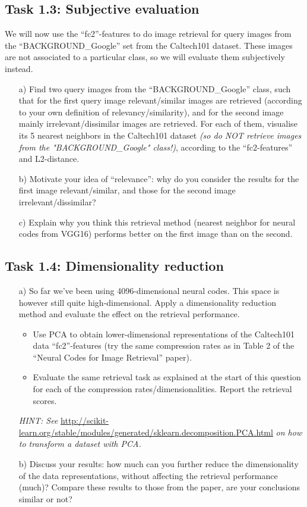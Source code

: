 \documentclass[a4paper,twoside,10pt]{article}
\begin{document}
\subsection*{Task 1.3: Subjective evaluation}
We will now use the ``fc2''-features to do image retrieval for query images from the ``BACKGROUND\_Google'' set from the Caltech101 dataset. These images are not associated to a particular class, so we will evaluate them subjectively instead.
\begin{itemize}
  \item[a)] Find two query images from the ``BACKGROUND\_Google'' class, such that for the first query image relevant/similar images are retrieved (according to your own definition of relevancy/similarity), and for the second image mainly irrelevant/dissimilar images are retrieved. For each of them, visualise its 5 nearest neighbors in the Caltech101 dataset \emph{(so do NOT retrieve images from the "BACKGROUND\_Google" class!)}, according to the ``fc2-features'' and L2-distance.
  \item[b)] Motivate your idea of ``relevance'': why do you consider the results for the first image relevant/similar, and those for the second image irrelevant/dissimilar?
  \item[c)] Explain why you think this retrieval method (nearest neighbor for neural codes from VGG16) performs better on the first image than on the second.
\end{itemize}

\subsection*{Task 1.4: Dimensionality reduction}
\begin{itemize}
  \item[a)] So far we've been using 4096-dimensional neural codes. This space is however still quite high-dimensional. Apply a dimensionality reduction method and evaluate the effect on the retrieval performance.
  \begin{itemize}
    \item Use PCA to obtain lower-dimensional representations of the Caltech101 data ``fc2''-features (try the same compression rates as in Table 2 of the ``Neural Codes for Image Retrieval'' paper).
	\item Evaluate the same retrieval task as explained at the start of this question for each of the compression rates/dimensionalities. Report the retrieval scores.
  \end{itemize}
\emph{HINT: See} \url{http://scikit-learn.org/stable/modules/generated/sklearn.decomposition.PCA.html} \emph{on how to transform a dataset with PCA.}
  \item[b)] Discuss your results: how much can you further reduce the dimensionality of the data representations, without affecting the retrieval performance (much)? Compare these results to those from the paper, are your conclusions similar or not?
\end{itemize}
\end{document}
